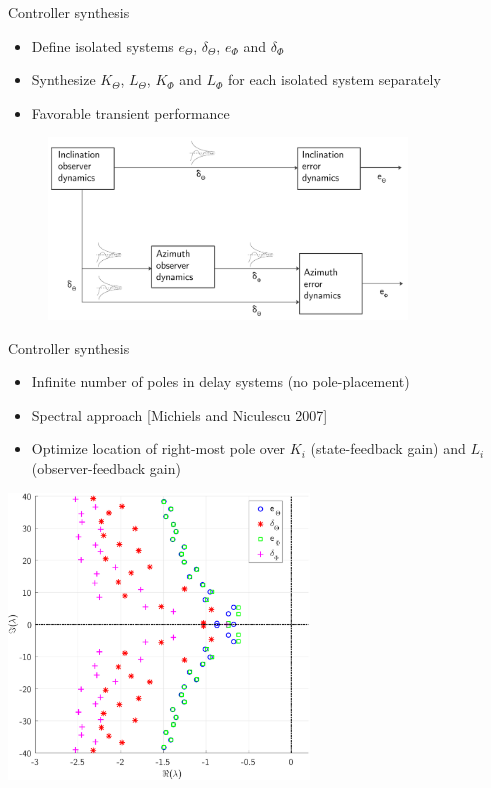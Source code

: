 \documentclass[10pt]{beamer}
\begin{document}
\begin{frame}{Controller synthesis}
\begin{itemize}\setlength\itemsep{0.9em}
	\item Define isolated systems $e_\Theta$, $\delta_\Theta$, $e_\Phi$ and $\delta_\Phi$
	\item Synthesize $K_\Theta$, $L_\Theta$, $K_\Phi$ and $L_\Phi$ for each isolated system separately
	\item Favorable transient performance
\end{itemize}
	\begin{figure}[ht]\centering
		\includegraphics[width=0.85\textwidth]{images/ISS.pdf}
	\end{figure}
\end{frame}

\begin{frame}{Controller synthesis}
\begin{itemize}
	\item Infinite number of poles in delay systems (no pole-placement)
	\item Spectral approach [Michiels and Niculescu 2007]
	\item Optimize location of right-most pole over $K_i$ (state-feedback gain) and $L_i$ (observer-feedback gain)
\end{itemize}

\hspace{2.0cm} \includegraphics[width=0.6\textwidth]{images/ClosedLoopPolesNeutral.pdf}
\end{frame}
\end{document}
